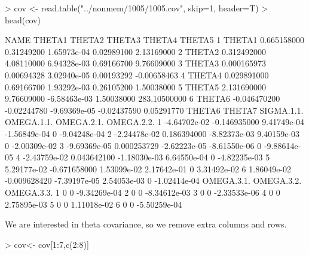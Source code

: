 \begin{Schunk}
\begin{Sinput}
> cov <- read.table("../nonmem/1005/1005.cov", skip=1, header=T)
> head(cov)
\end{Sinput}
\begin{Soutput}
    NAME       THETA1      THETA2       THETA3      THETA4       THETA5
1 THETA1  0.665158000  0.31249200  1.65973e-04  0.02989100   2.13169000
2 THETA2  0.312492000  4.08110000  6.94328e-03  0.69166700   9.76609000
3 THETA3  0.000165973  0.00694328  3.02940e-05  0.00193292  -0.00658463
4 THETA4  0.029891000  0.69166700  1.93292e-03  0.26105200   1.50038000
5 THETA5  2.131690000  9.76609000 -6.58463e-03  1.50038000 283.10500000
6 THETA6 -0.046470200 -0.02244780 -9.69369e-05 -0.02437590   0.05291770
        THETA6       THETA7   SIGMA.1.1.   OMEGA.1.1. OMEGA.2.1.   OMEGA.2.2.
1 -4.64702e-02 -0.146935000  9.41749e-04 -1.56849e-04          0 -9.04248e-04
2 -2.24478e-02  0.186394000 -8.82373e-03  9.40159e-03          0 -2.00309e-02
3 -9.69369e-05  0.000253729 -2.62223e-05 -8.61550e-06          0 -9.88614e-05
4 -2.43759e-02  0.043642100 -1.18030e-03  6.64550e-04          0 -4.82235e-03
5  5.29177e-02 -0.671658000  1.53099e-02  2.17642e-01          0  3.31492e-02
6  1.86049e-02 -0.009628420 -7.39197e-05  2.54053e-03          0 -1.02414e-04
  OMEGA.3.1. OMEGA.3.2.   OMEGA.3.3.
1          0          0 -9.34269e-04
2          0          0 -8.34612e-03
3          0          0 -2.33533e-06
4          0          0  2.75895e-03
5          0          0  1.11018e-02
6          0          0 -5.50259e-04
\end{Soutput}
\end{Schunk}
We are interested in theta covariance, so we remove extra columns and rows.
\begin{Schunk}
\begin{Sinput}
> cov<- cov[1:7,c(2:8)]
\end{Sinput}
\end{Schunk}
